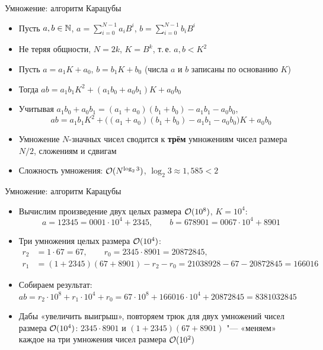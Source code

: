 \documentclass{ca-slides}
\begin{document}
\begin{canvasframe}[shrink=16]{Умножение: алгоритм Карацубы}
  \small
  \begin{itemize}
    \item Пусть $a, b \in \mathbb{N}$, $a = \sum_{i=0}^{N-1} a_i B^i$, $b = \sum_{i=0}^{N-1} b_i B^i$
    \item Не теряя общности, $N = 2k$, $K = B^k$, т.\,е. $a, b < K^2$
    \item Пусть $a = a_1 K + a_0$, $b = b_1 K + b_0$ (числа $a$ и $b$ записаны по основанию $K$)
    \item Тогда $ab = a_1 b_1 K^2 + (a_1 b_0 + a_0 b_1) K + a_0 b_0$
    \item Учитывая $a_1 b_0 + a_0 b_1 = (a_1 + a_0)(b_1 + b_0) - a_1 b_1 - a_0 b_0$,
      \[ab = a_1 b_1 K^2 + \bigl((a_1 + a_0)(b_1 + b_0) - a_1 b_1 - a_0 b_0\bigr) K + a_0 b_0\]
    \item Умножение $N$-значных чисел сводится к \textbf{трём} умножениям чисел размера $N/2$,
      сложениям и сдвигам
    \item Сложность умножения: $\mathcal{O}(N^{\log_2 3})$, $\log_2 3 \approx 1{,}585 < 2$
  \end{itemize}
\end{canvasframe}

\begin{canvasframe}[shrink=12]{Умножение: алгоритм Карацубы}
  \small
  \begin{itemize}
    \item Вычислим произведение двух целых размера $\mathcal{O}(10^8)$, $K = 10^4$:
      \[a = 12345 = 0001 \cdot 10^4 + 2345,\qquad b = 678901 = 0067 \cdot 10^4 + 8901\]
    \item Три умножения целых размера $\mathcal{O}(10^4)$:
      \begin{align*}
        r_2 &= 1 \cdot 67 = 67, \qquad r_0 = 2345 \cdot 8901 = 20872845,\\
        r_1 &= (1 + 2345)(67 + 8901) - r_2 - r_0 = 21038928 - 67 - 20872845 = 166016
      \end{align*}
    \item Собираем результат:
      $ab = r_2 \cdot 10^8 + r_1 \cdot 10^4 + r_0 = 67 \cdot 10^8 + 166016 \cdot 10^4 + 20872845
      = 8381032845$
    \item Дабы «увеличить выигрыш», повторяем трюк для двух умножений чисел размера
      $\mathcal{O}(10^4)$: $2345 \cdot 8901$ и $(1 + 2345)(67 + 8901)$ "--- «меняем» каждое на три
      умножения чисел размера $\mathcal{O}(10^2)$
  \end{itemize}
\end{canvasframe}
\end{document}
